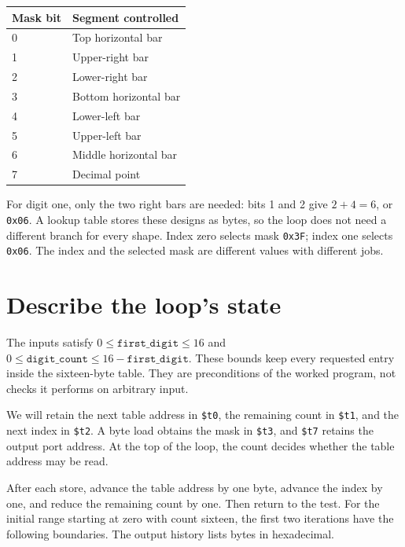 \begin{center}
  \begin{tabular}{ll}
    \toprule
    Mask bit & Segment controlled    \\
    \midrule
    0        & Top horizontal bar    \\
    1        & Upper-right bar       \\
    2        & Lower-right bar       \\
    3        & Bottom horizontal bar \\
    4        & Lower-left bar        \\
    5        & Upper-left bar        \\
    6        & Middle horizontal bar \\
    7        & Decimal point         \\
    \bottomrule
  \end{tabular}
\end{center}

For digit one, only the two right bars are needed: bits 1 and 2 give
$2+4=6$, or \texttt{0x06}. A lookup table stores these designs as bytes, so the
loop does not need a different branch for every shape. Index zero selects mask
\texttt{0x3F}; index one selects \texttt{0x06}. The index and the selected mask
are different values with different jobs.

\section{Describe the loop's state}

The inputs satisfy $0\leq\texttt{first\_digit}\leq16$ and
$0\leq\texttt{digit\_count}\leq16-\texttt{first\_digit}$. These bounds keep every
requested entry inside the sixteen-byte table. They are preconditions of the
worked program, not checks it performs on arbitrary input.

We will retain the next table address in \texttt{\$t0}, the remaining count in
\texttt{\$t1}, and the next index in \texttt{\$t2}. A byte load obtains the mask
in \texttt{\$t3}, and \texttt{\$t7} retains the output port address. At the top
of the loop, the count decides whether the table address may be read.

After each store, advance the table address by one byte, advance the index by
one, and reduce the remaining count by one. Then return to the test. For the
initial range starting at zero with count sixteen, the first two iterations have
the following boundaries. The output history lists bytes in hexadecimal.


